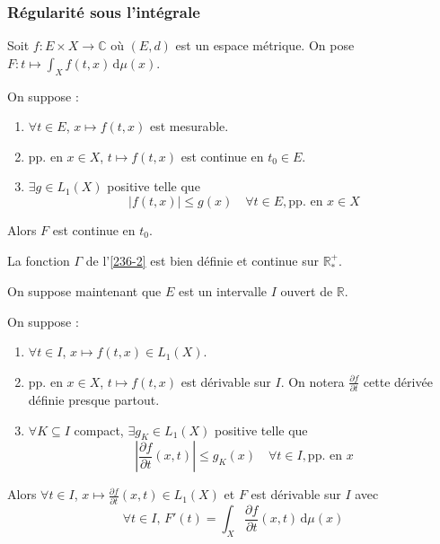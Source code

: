 	\subsubsection{Régularité sous l'intégrale}


	Soit $f : E \times X \rightarrow \mathbb{C}$ où $(E, d)$ est un espace métrique. On pose $F : t \mapsto \int_X f(t, x) \, \mathrm{d}\mu(x)$.

	\begin{theorem}
		On suppose :
		\begin{enumerate}[label=(\roman*)]
			\item $\forall t \in E$, $x \mapsto f(t,x)$ est mesurable.
			\item pp. en $x \in X$, $t \mapsto f(t,x)$ est continue en $t_0 \in E$.
			\item $\exists g \in L_1(X)$ positive telle que
			\[ |f(t,x)| \leq g(x) \quad \forall t \in E, \text{pp. en } x \in X \]
		\end{enumerate}
		Alors $F$ est continue en $t_0$.
	\end{theorem}


	\begin{example}
		La fonction $\Gamma$ de l'\cref{236-2} est bien définie et continue sur $\mathbb{R}^+_*$.
	\end{example}


	On suppose maintenant que $E$ est un intervalle $I$ ouvert de $\mathbb{R}$.

	\begin{theorem}
		On suppose :
		\begin{enumerate}[label=(\roman*)]
			\item $\forall t \in I$, $x \mapsto f(t,x) \in L_1(X)$.
			\item pp. en $x \in X$, $t \mapsto f(t,x)$ est dérivable sur $I$. On notera $\frac{\partial f}{\partial t}$ cette dérivée définie presque partout.
			\item $\forall K \subseteq I$ compact, $\exists g_K \in L_1(X)$ positive telle que
			\[ \left| \frac{\partial f}{\partial t}(x,t) \right| \leq g_K(x) \quad \forall t \in I, \text{pp. en } x \]
		\end{enumerate}
		Alors $\forall t \in I$, $x \mapsto \frac{\partial f}{\partial t}(x, t) \in L_1(X)$ et $F$ est dérivable sur $I$ avec
		\[ \forall t \in I, \, F'(t) = \int_X \frac{\partial f}{\partial t}(x, t) \, \mathrm{d}\mu(x) \]
	\end{theorem}

